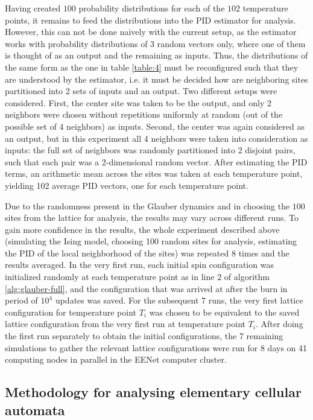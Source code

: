 \documentclass[12pt]{article}
\begin{document}
Having created $100$ probability distributions for each of the $102$ temperature points, it remains to feed the distributions into the PID estimator for analysis. However, this can not be done naively with the current setup, as the estimator works with probability distributions of 3 random vectors only, where one of them is thought of as an output and the remaining as inputs. Thus, the distributions of the same form as the one in table \ref{table:4} must be reconfigured such that they are understood by the estimator, i.e. it must be decided how are neighboring sites partitioned into 2 sets of inputs and an output. Two different setups were considered. First, the center site was taken to be the output, and only 2 neighbors were chosen without repetitions uniformly at random (out of the possible set of 4 neighbors) as inputs. Second, the center was again considered as an output, but in this experiment all 4 neighbors were taken into consideration as inputs: the full set of neighbors was randomly partitioned into 2 disjoint pairs, such that each pair was a 2-dimensional random vector. After estimating the PID terms, an arithmetic mean across the sites was taken at each temperature point, yielding 102 average PID vectors, one for each temperature point. 

Due to the randomness present in the Glauber dynamics and in choosing the $100$ sites from the lattice for analysis, the results may vary across different runs. To gain more confidence in the results, the whole experiment described above (simulating the Ising model, choosing 100 random sites for analysis, estimating the PID of the local neighborhood of the sites) was repeated 8 times and the results averaged. In the very first run, each initial spin configuration was initialized randomly at each temperature point as in line 2 of algorithm \ref{alg:glauber-full}, and the configuration that was arrived at after the burn in period of $10^4$ updates was saved. For the subsequent 7 runs, the very first lattice configuration for temperature point $T_i$ was chosen to be equivalent to the saved lattice configuration from the very first run at temperature point $T_i$. After doing the first run separately to obtain the initial configurations, the 7 remaining simulations to gather the relevant lattice configurations were run for 8 days on 41 computing nodes in parallel in the EENet computer cluster.

\subsection{Methodology for analysing elementary cellular automata}
\end{document}
